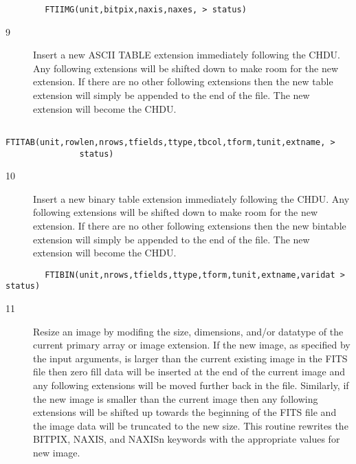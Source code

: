 \documentclass[11pt]{book}
\begin{document}
\begin{verbatim}
        FTIIMG(unit,bitpix,naxis,naxes, > status)
\end{verbatim}

\begin{description}
\item[9 ] Insert a new ASCII TABLE extension immediately following the CHDU.
    Any following extensions will be shifted down to make room for
    the new extension.  If there are no other following extensions
    then the new table extension will simply be appended to the
   end of the file.  The new extension will become the CHDU.
\end{description}

\begin{verbatim}
        FTITAB(unit,rowlen,nrows,tfields,ttype,tbcol,tform,tunit,extname, >
               status)
\end{verbatim}

\begin{description}
\item[10]  Insert a new binary table extension immediately following the CHDU.
    Any following extensions will be shifted down to make room for
    the new extension.  If there are no other following extensions
    then the new bintable extension will simply be appended to the
   end of the file.  The new extension will become the CHDU.
\end{description}

\begin{verbatim}
        FTIBIN(unit,nrows,tfields,ttype,tform,tunit,extname,varidat > status)
\end{verbatim}

\begin{description}
\item[11]  Resize an image by modifing the size, dimensions, and/or datatype of the
    current primary array or image extension. If the new image, as specified
    by the input arguments, is larger than the current existing image
    in the FITS file then zero fill data will be inserted at the end
    of the current image and any following extensions will be moved
    further back in the file.  Similarly, if the new image is
    smaller than the current image then any following extensions
    will be shifted up towards the beginning of the FITS file
    and the image data will be truncated to the new size.
    This routine rewrites the BITPIX, NAXIS, and NAXISn keywords
   with the appropriate values for new image.
\end{description}
\end{document}

